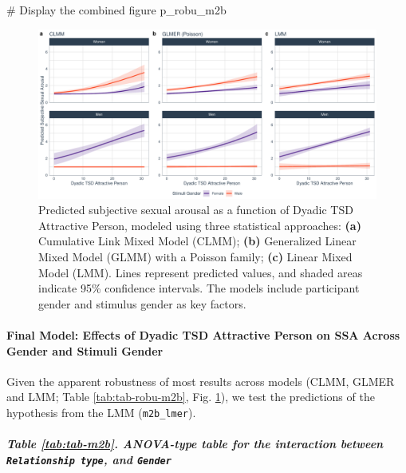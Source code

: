 \documentclass[
  bookmarksnumbered]{article}
\newenvironment{Shaded}{\begin{snugshade}}{\end{snugshade}}
\newcommand{\CommentTok}[1]{\textcolor[rgb]{0.50,0.62,0.50}{#1}}
\newcommand{\NormalTok}[1]{\textcolor[rgb]{0.80,0.80,0.80}{#1}}
\begin{document}
\begin{Shaded}
\begin{Highlighting}[]
\CommentTok{\# Display the combined figure}
\NormalTok{p\_robu\_m2b}
\end{Highlighting}
\end{Shaded}

\begin{figure}
\centering
\includegraphics{Sexual_Desire_Arousal_files/figure-latex/preds-m2b-1.pdf}
\caption{\label{fig:preds-m2b}Predicted subjective sexual arousal as a function of Dyadic TSD Attractive Person, modeled using three statistical approaches: \textbf{(a)} Cumulative Link Mixed Model (CLMM); \textbf{(b)} Generalized Linear Mixed Model (GLMM) with a Poisson family; \textbf{(c)} Linear Mixed Model (LMM). Lines represent predicted values, and shaded areas indicate 95\% confidence intervals. The models include participant gender and stimulus gender as key factors.}
\end{figure}

\paragraph{Final Model: Effects of Dyadic TSD Attractive Person on SSA Across Gender and Stimuli Gender}\label{final-model-effects-of-dyadic-tsd-attractive-person-on-ssa-across-gender-and-stimuli-gender}

Given the apparent robustness of most results across models (CLMM, GLMER and LMM; Table \ref{tab:tab-robu-m2b}, Fig. \ref{fig:preds-m2b}), we test the predictions of the hypothesis from the LMM (\texttt{m2b\_lmer}).

\subparagraph{\texorpdfstring{Table \ref{tab:tab-m2b}. ANOVA-type table for the interaction between \texttt{Relationship\ type}, and \texttt{Gender}}{Table \ref{tab:tab-m2b}. ANOVA-type table for the interaction between Relationship type, and Gender}}\label{table-reftabtab-m2b.-anova-type-table-for-the-interaction-between-relationship-type-and-gender}
\end{document}
